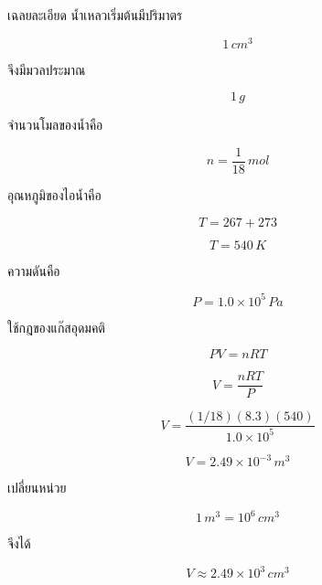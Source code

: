 \begin{examplebox}{เฉลยละเอียด}
น้ำเหลวเริ่มต้นมีปริมาตร

\[
1\,\si{cm^3}
\]

จึงมีมวลประมาณ

\[
1\,\si{g}
\]

จำนวนโมลของน้ำคือ

\[
n=\frac{1}{18}\,\si{mol}
\]

อุณหภูมิของไอน้ำคือ

\[
T=267+273
\]

\[
T=540\,\si{K}
\]

ความดันคือ

\[
P=1.0\times10^5\,\si{Pa}
\]

ใช้กฎของแก๊สอุดมคติ

\[
PV=nRT
\]

\[
V=\frac{nRT}{P}
\]

\[
V
=
\frac{(1/18)(8.3)(540)}{1.0\times10^5}
\]

\[
V=2.49\times10^{-3}\,\si{m^3}
\]

เปลี่ยนหน่วย

\[
1\,\si{m^3}=10^6\,\si{cm^3}
\]

จึงได้

\[
\boxed{
V\approx2.49\times10^3\,\si{cm^3}
}
\]
\end{examplebox}